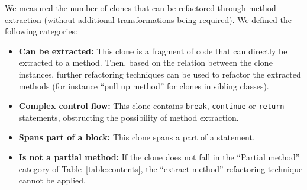 We measured the number of clones that can be refactored through method extraction (without additional transformations being required). We defined the following categories:
\begin{itemize}
    \item \textbf{Can be extracted:} This clone is a fragment of code that can directly be extracted to a method. Then, based on the relation between the clone instances, further refactoring techniques can be used to refactor the extracted methods (for instance ``pull up method'' for clones in sibling classes).
    \item \textbf{Complex control flow:} This clone contains \texttt{break}, \texttt{continue} or \texttt{return} statements, obstructing the possibility of method extraction.
    \item \textbf{Spans part of a block:} This clone spans a part of a statement.
    \item \textbf{Is not a partial method:} If the clone does not fall in the ``Partial method'' category of Table~\ref{table:contents}, the ``extract method'' refactoring technique cannot be applied.
\end{itemize}


